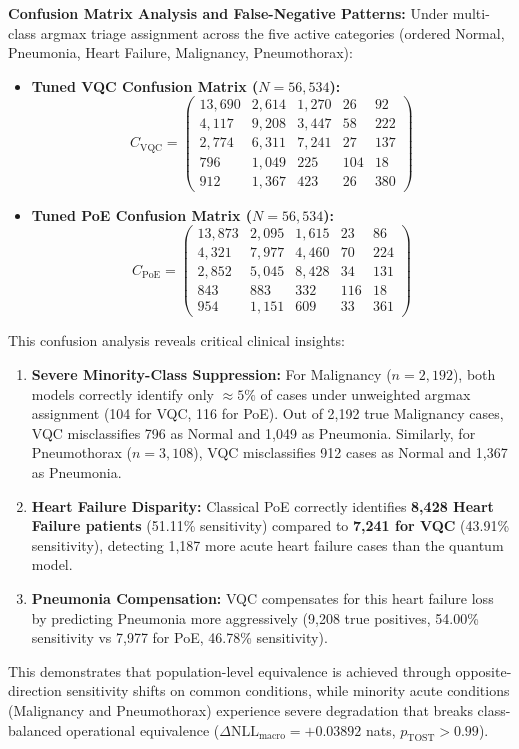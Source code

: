\documentclass[10pt,a4paper]{article}
\begin{document}
\noindent\textbf{Confusion Matrix Analysis and False-Negative Patterns:} Under multi-class argmax triage assignment across the five active categories (ordered Normal, Pneumonia, Heart Failure, Malignancy, Pneumothorax):
\begin{itemize}
  \item \textbf{Tuned VQC Confusion Matrix ($N=56,534$):}
  \begin{equation*}
  C_{\text{VQC}} = \begin{pmatrix}
  13,690 & 2,614 & 1,270 & 26 & 92 \\
  4,117 & 9,208 & 3,447 & 58 & 222 \\
  2,774 & 6,311 & 7,241 & 27 & 137 \\
  796 & 1,049 & 225 & 104 & 18 \\
  912 & 1,367 & 423 & 26 & 380
  \end{pmatrix}
  \end{equation*}
  \item \textbf{Tuned PoE Confusion Matrix ($N=56,534$):}
  \begin{equation*}
  C_{\text{PoE}} = \begin{pmatrix}
  13,873 & 2,095 & 1,615 & 23 & 86 \\
  4,321 & 7,977 & 4,460 & 70 & 224 \\
  2,852 & 5,045 & 8,428 & 34 & 131 \\
  843 & 883 & 332 & 116 & 18 \\
  954 & 1,151 & 609 & 33 & 361
  \end{pmatrix}
  \end{equation*}
\end{itemize}
This confusion analysis reveals critical clinical insights:
\begin{enumerate}
  \item \textbf{Severe Minority-Class Suppression:} For Malignancy ($n=2,192$), both models correctly identify only $\approx 5\%$ of cases under unweighted argmax assignment (104 for VQC, 116 for PoE). Out of 2,192 true Malignancy cases, VQC misclassifies 796 as Normal and 1,049 as Pneumonia. Similarly, for Pneumothorax ($n=3,108$), VQC misclassifies 912 cases as Normal and 1,367 as Pneumonia.
  \item \textbf{Heart Failure Disparity:} Classical PoE correctly identifies \textbf{8,428 Heart Failure patients} (51.11\% sensitivity) compared to \textbf{7,241 for VQC} (43.91\% sensitivity), detecting 1,187 more acute heart failure cases than the quantum model.
  \item \textbf{Pneumonia Compensation:} VQC compensates for this heart failure loss by predicting Pneumonia more aggressively (9,208 true positives, 54.00\% sensitivity vs 7,977 for PoE, 46.78\% sensitivity).
\end{enumerate}
This demonstrates that population-level equivalence is achieved through opposite-direction sensitivity shifts on common conditions, while minority acute conditions (Malignancy and Pneumothorax) experience severe degradation that breaks class-balanced operational equivalence ($\Delta\text{NLL}_{\text{macro}} = +0.03892$ nats, $p_{\text{TOST}} > 0.99$).
\end{document}
